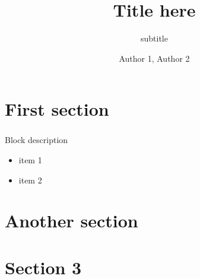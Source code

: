 \documentclass[aspectratio=169]{beamer}
\title{Title here}
\subtitle{subtitle}
\author{Author 1, Author 2}
\begin{document}
\begin{frame}[plain]
  \titlepage
\end{frame}
 
\section{First section}
\begin{frame}
  \frametitle{\insertsection}
  \begin{block}{Block description}
    \begin{itemize}
     \item item 1
     \item item 2
    \end{itemize}   
  \end{block}
\end{frame}

\section{Another section}
\begin{frame}
  \frametitle{\insertsection}
\end{frame}

\section{Section 3}
\begin{frame}

\end{frame}
\end{document}
